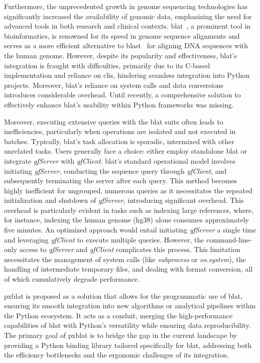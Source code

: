 \documentclass[10pt,letterpaper]{article}
\begin{document}
Furthermore, the unprecedented growth in genome sequencing technologies has significantly increased the availability of genomic data, emphasizing the need for advanced tools in both research and clinical contexts.
\gls{blat}~\cite{kent2002blat}, a prominent tool in bioinformatics, is renowned for its speed in genome sequence alignments and serves as a more efficient alternative to \gls{blast}~\cite{altschul1990basic} for aligning DNA sequences with the human genome.
However, despite its popularity and effectiveness, \gls{blat}'s integration is fraught with difficulties, primarily due to its C-based implementation and reliance on \glspl{cli}, hindering seamless integration into Python projects.
Moreover, \gls{blat}'s reliance on system calls and data conversions introduces considerable overhead.
Until recently, a comprehensive solution to effectively enhance  \gls{blat}'s usability within Python frameworks was missing.

Moreover, executing extensive queries with the \gls{blat} suite often leads to inefficiencies, particularly when operations are isolated and not executed in batches.
Typically, \gls{blat}'s task allocation is sporadic, intermixed with other unrelated tasks.
Users generally face a choice: either employ standalone \gls{blat} or integrate \emph{gfServer} with \emph{gfClient}.
\gls{blat}'s standard operational model involves initiating \emph{gfServer}, conducting the sequence query through \emph{gfClient}, and subsequently terminating the server after each query.
This method becomes highly inefficient for ungrouped, numerous queries as it necessitates the repeated initialization and shutdown of \emph{gfServer}, introducing significant overhead.
This overhead is particularly evident in tasks such as indexing large references, where, for instance, indexing the human genome (hg38) alone consumes approximately five minutes.
An optimized approach would entail initiating \emph{gfServer} a single time and leveraging \emph{gfClient} to execute multiple queries.
However, the command-line-only access to \emph{gfServer} and \emph{gfClient} complicates this process.
This limitation necessitates the management of system calls (like \emph{subprocess} or \emph{os.system}), the handling of intermediate temporary files, and dealing with format conversion, all of which cumulatively degrade performance.

\gls{pxblat} is proposed as a solution that allows for the programmatic use of \gls{blat}, ensuring its smooth integration into new algorithms or analytical pipelines within the Python ecosystem.
It acts as a conduit, merging the high-performance capabilities of \gls{blat} with Python's versatility while ensuring data reproducibility.
The primary goal of \gls{pxblat} is to bridge the gap in the current landscape by providing a Python binding library tailored specifically for \gls{blat}, addressing both the efficiency bottlenecks and the ergonomic challenges of its integration.
\end{document}
